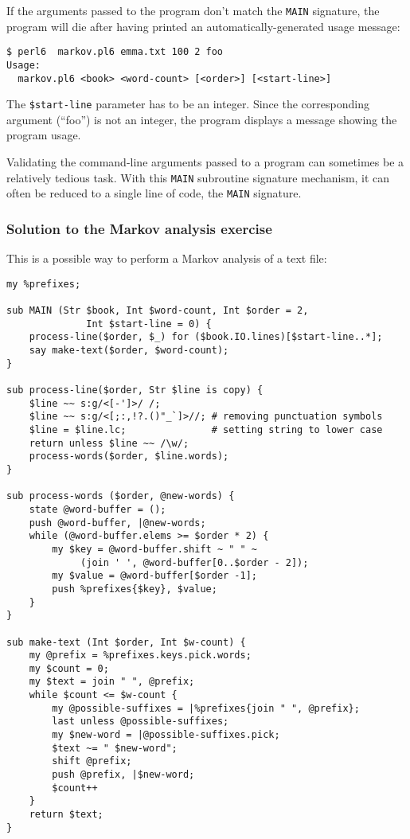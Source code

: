 {If the arguments passed to the program don't match the {\tt MAIN} 
signature, the program will die after having printed an 
automatically-generated usage message:

\begin{verbatim}
$ perl6  markov.pl6 emma.txt 100 2 foo
Usage:
  markov.pl6 <book> <word-count> [<order>] [<start-line>]
\end{verbatim}
The \verb'$start-line' parameter has to be an integer. Since 
the corresponding argument (``foo'') is not an integer, the 
program displays a message showing the program usage.

Validating the command-line arguments passed to a program 
can sometimes be a relatively tedious task. With this 
{\tt MAIN} subroutine signature mechanism, it can often be reduced 
to a single line of code, the {\tt MAIN} signature.

\subsubsection{Solution to the Markov analysis exercise}

This is a possible way to perform a Markov analysis of a 
text file:

\begin{verbatim}
my %prefixes;

sub MAIN (Str $book, Int $word-count, Int $order = 2, 
              Int $start-line = 0) {
    process-line($order, $_) for ($book.IO.lines)[$start-line..*]; 
    say make-text($order, $word-count);
}

sub process-line($order, Str $line is copy) {
    $line ~~ s:g/<[-']>/ /; 
    $line ~~ s:g/<[;:,!?.()"_`]>//; # removing punctuation symbols
    $line = $line.lc;               # setting string to lower case
    return unless $line ~~ /\w/;
    process-words($order, $line.words);
}

sub process-words ($order, @new-words) {
    state @word-buffer = ();
    push @word-buffer, |@new-words;
    while (@word-buffer.elems >= $order * 2) {
        my $key = @word-buffer.shift ~ " " ~ 
             (join ' ', @word-buffer[0..$order - 2]);
        my $value = @word-buffer[$order -1];
        push %prefixes{$key}, $value;
    }
}

sub make-text (Int $order, Int $w-count) {
    my @prefix = %prefixes.keys.pick.words;
    my $count = 0;
    my $text = join " ", @prefix;
    while $count <= $w-count {
        my @possible-suffixes = |%prefixes{join " ", @prefix};
        last unless @possible-suffixes;
        my $new-word = |@possible-suffixes.pick;
        $text ~= " $new-word";
        shift @prefix;
        push @prefix, |$new-word;
        $count++
    }
    return $text;
}     
\end{verbatim}

}

